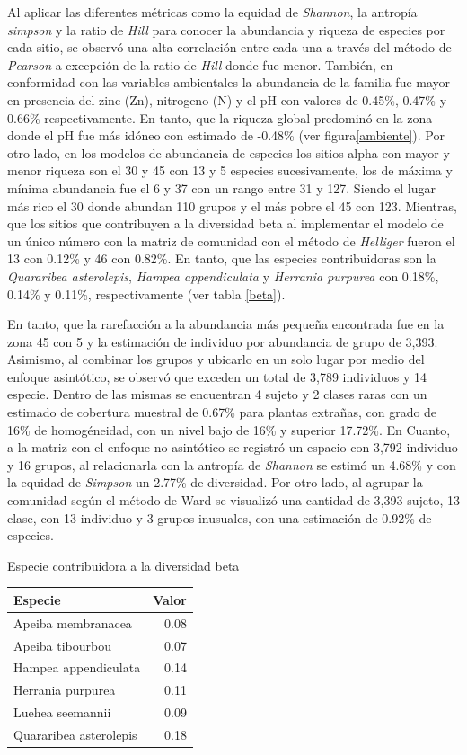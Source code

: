 \documentclass[11pt,]{article}
\begin{document}
Al aplicar las diferentes métricas como la equidad de \emph{Shannon}, la
antropía \emph{simpson} y la ratio de \emph{Hill} para conocer la
abundancia y riqueza de especies por cada sitio, se observó una alta
correlación entre cada una a través del método de \emph{Pearson} a
excepción de la ratio de \emph{Hill} donde fue menor. También, en
conformidad con las variables ambientales la abundancia de la familia
fue mayor en presencia del zinc (Zn), nitrogeno (N) y el pH con valores
de 0.45\%, 0.47\% y 0.66\% respectivamente. En tanto, que la riqueza
global predominó en la zona donde el pH fue más idóneo con estimado de
-0.48\% (ver figura\ref{ambiente}). Por otro lado, en los modelos de
abundancia de especies los sitios alpha con mayor y menor riqueza son el
30 y 45 con 13 y 5 especies sucesivamente, los de máxima y mínima
abundancia fue el 6 y 37 con un rango entre 31 y 127. Siendo el lugar
más rico el 30 donde abundan 110 grupos y el más pobre el 45 con 123.
Mientras, que los sitios que contribuyen a la diversidad beta al
implementar el modelo de un único número con la matriz de comunidad con
el método de \emph{Helliger} fueron el 13 con 0.12\% y 46 con 0.82\%. En
tanto, que las especies contribuidoras son la \emph{Quararibea
asterolepis}, \emph{Hampea appendiculata} y \emph{Herrania purpurea} con
0.18\%, 0.14\% y 0.11\%, respectivamente (ver tabla \ref{beta}).

En tanto, que la rarefacción a la abundancia más pequeña encontrada fue
en la zona 45 con 5 y la estimación de individuo por abundancia de grupo
de 3,393. Asimismo, al combinar los grupos y ubicarlo en un solo lugar
por medio del enfoque asintótico, se observó que exceden un total de
3,789 individuos y 14 especie. Dentro de las mismas se encuentran 4
sujeto y 2 clases raras con un estimado de cobertura muestral de 0.67\%
para plantas extrañas, con grado de 16\% de homogéneidad, con un nivel
bajo de 16\% y superior 17.72\%. En Cuanto, a la matriz con el enfoque
no asintótico se registró un espacio con 3,792 individuo y 16 grupos, al
relacionarla con la antropía de \emph{Shannon} se estimó un 4.68\% y con
la equidad de \emph{Simpson} un 2.77\% de diversidad. Por otro lado, al
agrupar la comunidad según el método de Ward se visualizó una cantidad
de 3,393 sujeto, 13 clase, con 13 individuo y 3 grupos inusuales, con
una estimación de 0.92\% de especies.

Especie contribuidora a la diversidad beta\label{beta}

\begin{longtable}[]{@{}lr@{}}
\toprule
Especie & Valor\tabularnewline
\midrule
\endhead
Apeiba membranacea & 0.08\tabularnewline
Apeiba tibourbou & 0.07\tabularnewline
Hampea appendiculata & 0.14\tabularnewline
Herrania purpurea & 0.11\tabularnewline
Luehea seemannii & 0.09\tabularnewline
Quararibea asterolepis & 0.18\tabularnewline
\bottomrule
\end{longtable}
\end{document}
